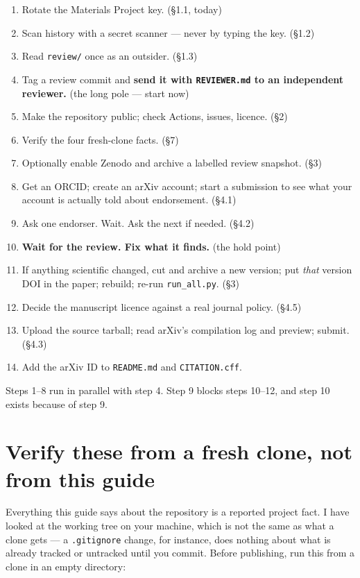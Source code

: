 \documentclass[11pt]{article}
\begin{document}
\begin{enumerate}[nosep]
\item Rotate the Materials Project key. \hfill (\S1.1, today)
\item Scan history with a secret scanner --- never by typing the key. \hfill (\S1.2)
\item Read \texttt{review/} once as an outsider. \hfill (\S1.3)
\item Tag a review commit and \textbf{send it with \texttt{REVIEWER.md} to an independent
      reviewer.} \hfill (the long pole --- start now)
\item Make the repository public; check Actions, issues, licence. \hfill (\S2)
\item Verify the four fresh-clone facts. \hfill (\S7)
\item Optionally enable Zenodo and archive a labelled review snapshot. \hfill (\S3)
\item Get an ORCID; create an arXiv account; start a submission to see what your account is
      actually told about endorsement. \hfill (\S4.1)
\item Ask one endorser. Wait. Ask the next if needed. \hfill (\S4.2)
\item \textbf{Wait for the review. Fix what it finds.} \hfill (the hold point)
\item If anything scientific changed, cut and archive a new version; put \emph{that} version
      DOI in the paper; rebuild; re-run \texttt{run\_all.py}. \hfill (\S3)
\item Decide the manuscript licence against a real journal policy. \hfill (\S4.5)
\item Upload the source tarball; read arXiv's compilation log and preview; submit.
      \hfill (\S4.3)
\item Add the arXiv ID to \texttt{README.md} and \texttt{CITATION.cff}.
\end{enumerate}

Steps 1--8 run in parallel with step 4. Step 9 blocks steps 10--12, and step 10 exists
because of step 9.

\section{Verify these from a fresh clone, not from this guide}

Everything this guide says about the repository is a reported project fact. I have looked at
the working tree on your machine, which is not the same as what a clone gets --- a
\texttt{.gitignore} change, for instance, does nothing about what is already tracked or
untracked until you commit. Before publishing, run this from a clone in an empty directory:
\end{document}
